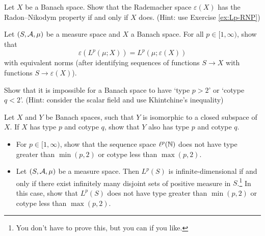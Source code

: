 \begin{exercise}
  Let $X$ be a Banach space.
  Show that the Rademacher space $\varepsilon(X)$ has the Radon--Nikodym property if and only if $X$ does. (Hint: use Exercise \ref{ex:Lp-RNP})
\end{exercise}

\begin{exercise}\label{ex:rad-leb-comm}
  Let $(S,\mathcal{A},\mu)$ be a measure space and $X$ a Banach space.
  For all $p \in [1,\infty)$, show that
  \begin{equation*}
    \varepsilon(L^{p}(\mu;X)) = L^{p}(\mu;\varepsilon(X))
  \end{equation*}
  with equivalent norms (after identifying sequences of functions $S \to X$ with functions $S \to \varepsilon(X)$). 
\end{exercise}

\begin{exercise}\label{ex:no-extreme-types}
  Show that it is impossible for a Banach space to have `type $p > 2$' or `cotype $q < 2$'. (Hint: consider the scalar field and use Khintchine's inequality)
\end{exercise}

\begin{exercise}\label{ex:isomorphic-cotype}
  Let $X$ and $Y$ be Banach spaces, such that $Y$ is isomorphic to a closed subspace of $X$.
  If $X$ has type $p$ and cotype $q$, show that $Y$ also has type $p$ and cotype $q$.
\end{exercise}

\begin{exercise}\label{ex:Lp-optimal-type}
  \begin{itemize}
  \item
    For $p \in [1,\infty)$, show that the sequence space $\ell^{p}(\mathbb{N})$ does not have type greater than $\min(p,2)$ or cotype less than $\max(p,2)$.
  \item
    Let $(S,\mathcal{A},\mu)$ be a measure space.
    Then $L^p(S)$ is infinite-dimensional if and only if there exist infinitely many disjoint sets of positive measure in $S$.\footnote{You don't have to prove this, but you can if you like.}
    In this case, show that $L^p(S)$ does not have type greater than $\min(p,2)$ or cotype less than $\max(p,2)$.
  \end{itemize}
\end{exercise}


